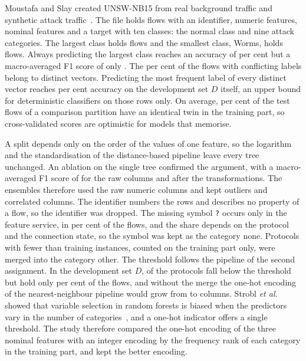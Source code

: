 \documentclass[10pt,conference]{IEEEtran}
\begin{document}
Moustafa and Slay created UNSW-NB15 from real background traffic and synthetic attack traffic~\cite{moustafa2015a}. The file holds \nFile{} flows with an identifier, \nNumeric{} numeric features, \nNominal{} nominal features and a target with ten classes: the normal class and nine attack categories. The largest class holds \nClassMax{} flows and the smallest class, Worms, holds \nClassMin{} flows. Always predicting the largest class reaches an accuracy of \pMajorityAccuracy{} per cent but a macro-averaged F1 score of only \majorityMacroF{}. The \pConflictRows{} per cent of the flows with conflicting labels belong to \nConflictVec{} distinct vectors. Predicting the most frequent label of every distinct vector reaches \pCeiling{} per cent accuracy on the development set $D$ itself, an upper bound for deterministic classifiers on those rows only. On average, \OPCompTwinShare{} per cent of the test flows of a comparison partition have an identical twin in the training part, so cross-validated scores are optimistic for models that memorise.

A split depends only on the order of the values of one feature, so the logarithm and the standardisation of the distance-based pipeline leave every tree unchanged. An ablation on the single tree confirmed the argument, with a macro-averaged F1 score of \AbTreeRawMacroF{} for the raw columns and \AbTreeLogStdMacroF{} after the transformations. The ensembles therefore used the raw numeric columns and kept outliers and correlated columns. The identifier numbers the rows and describes no property of a flow, so the identifier was dropped. The missing symbol \texttt{?} occurs only in the feature service, in \pServiceMissing{} per cent of the flows, and the share depends on the protocol and the connection state, so the symbol was kept as the category none. Protocols with fewer than \protoThreshold{} training instances, counted on the training part only, were merged into the category other. The threshold follows the pipeline of the second assignment. In the development set $D$, \nProtoRare{} of the \nProto{} protocols fall below the threshold but hold only \pProtoRareRows{} per cent of the flows, and without the merge the one-hot encoding of the nearest-neighbour pipeline would grow from \AbKnnFullColumns{} to \AbKnnNoRareColumns{} columns. Strobl \textit{et al.} showed that variable selection in random forests is biased when the predictors vary in the number of categories~\cite{strobl2007}, and a one-hot indicator offers a single threshold. The study therefore compared the one-hot encoding of the three nominal features with an integer encoding by the frequency rank of each category in the training part, and kept the better encoding.
\end{document}
